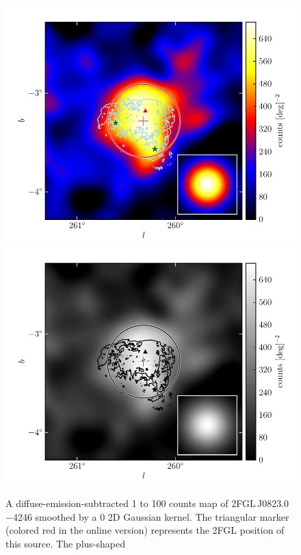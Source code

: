 \begin{figure}
    \ifcolorfigure
      \includegraphics{source_plots/source_Puppis_A_color.pdf}
    \else
      \includegraphics{source_plots/source_Puppis_A_bw.pdf}
    \fi
  \caption{A diffuse-emission-subtracted 1 \gev to 100 \gev counts map
  of 2FGL\,J0823.0$-$4246 smoothed by a 0 2D
  Gaussian kernel.  The triangular marker 
  (colored red in the online version)
  represents the 2FGL position of this source.  The plus-shaped
}
\end{figure}
